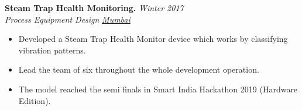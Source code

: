 \documentclass[10pt]{article}
\begin{document}
\textbf{\large Steam Trap Health Monitoring.} \hfill{\sl \small Winter 2017}\\
\textit{ Process Equipment Design }\hfill{\sl \small \href{https://www.mumbai.com}{Mumbai}}\\\vspace{-15pt}
\begin{itemize}[itemsep = -0.75 mm, leftmargin=*]
    \item Developed a Steam Trap Health Monitor device which works by classifying vibration patterns.
    \item Lead the team of six throughout the whole development operation.
    \item The model reached the semi finals in Smart India Hackathon 2019 (Hardware Edition).
\end{itemize}
\vspace*{-3pt}

\vspace{-5pt}
\end{document}
